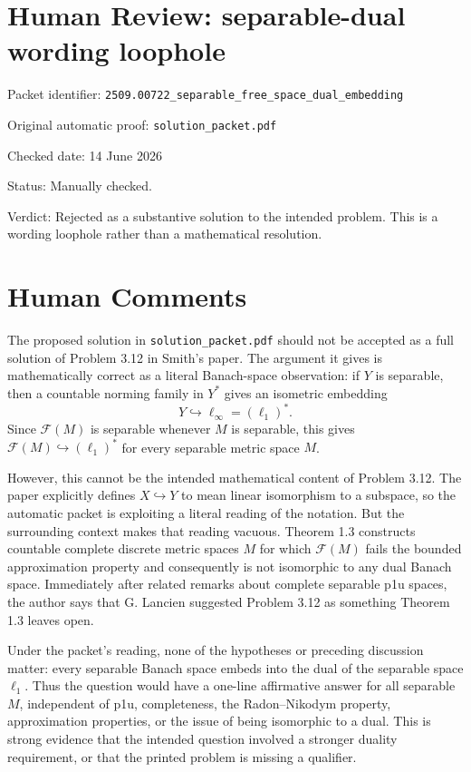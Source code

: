 \documentclass[11pt]{article}
\newcommand{\F}{\mathcal F}
\begin{document}
\section*{Human Review: separable-dual wording loophole}

\noindent Packet identifier:
\texttt{2509.00722\_separable\_free\_space\_dual\_embedding}

\noindent Original automatic proof: \texttt{solution\_packet.pdf}

\noindent Checked date: 14 June 2026

\noindent Status: Manually checked.

\noindent Verdict: Rejected as a substantive solution to the intended problem.
This is a wording loophole rather than a mathematical resolution.

\section*{Human Comments}

The proposed solution in \texttt{solution\_packet.pdf} should not be accepted
as a full solution of Problem 3.12 in Smith's paper.  The argument it gives is
mathematically correct as a literal Banach-space observation: if \(Y\) is
separable, then a countable norming family in \(Y^*\) gives an isometric
embedding
\[
  Y \hookrightarrow \ell_\infty=(\ell_1)^*.
\]
Since \(\F(M)\) is separable whenever \(M\) is separable, this gives
\(\F(M)\hookrightarrow(\ell_1)^*\) for every separable metric space \(M\).

However, this cannot be the intended mathematical content of Problem 3.12.
The paper explicitly defines \(X\hookrightarrow Y\) to mean linear isomorphism
to a subspace, so the automatic packet is exploiting a literal reading of the
notation.  But the surrounding context makes that reading vacuous.  Theorem
1.3 constructs countable complete discrete metric spaces \(M\) for which
\(\F(M)\) fails the bounded approximation property and consequently is not
isomorphic to any dual Banach space.  Immediately after related remarks about
complete separable p1u spaces, the author says that G. Lancien suggested
Problem 3.12 as something Theorem 1.3 leaves open.

Under the packet's reading, none of the hypotheses or preceding discussion
matter: every separable Banach space embeds into the dual of the separable
space \(\ell_1\).  Thus the question would have a one-line affirmative answer
for all separable \(M\), independent of p1u, completeness, the Radon--Nikodym
property, approximation properties, or the issue of being isomorphic to a
dual.  This is strong evidence that the intended question involved a stronger
duality requirement, or that the printed problem is missing a qualifier.
\end{document}
